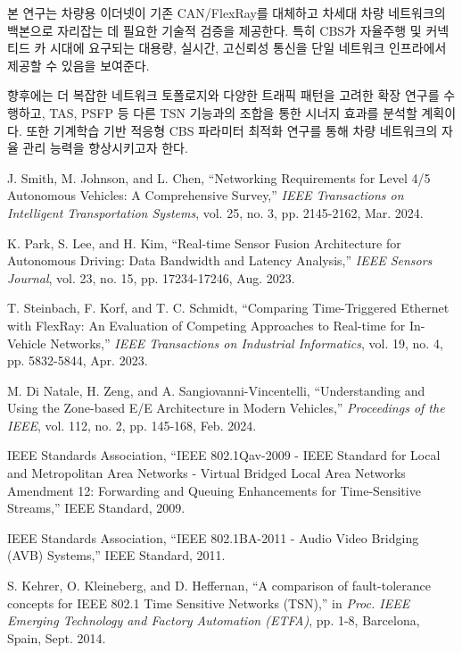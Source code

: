 \documentclass[10pt,twocolumn]{IEEEtran}
\begin{document}
본 연구는 차량용 이더넷이 기존 CAN/FlexRay를 대체하고 차세대 차량 네트워크의 백본으로 자리잡는 데 필요한 기술적 검증을 제공한다. 특히 CBS가 자율주행 및 커넥티드 카 시대에 요구되는 대용량, 실시간, 고신뢰성 통신을 단일 네트워크 인프라에서 제공할 수 있음을 보여준다.

향후에는 더 복잡한 네트워크 토폴로지와 다양한 트래픽 패턴을 고려한 확장 연구를 수행하고, TAS, PSFP 등 다른 TSN 기능과의 조합을 통한 시너지 효과를 분석할 계획이다. 또한 기계학습 기반 적응형 CBS 파라미터 최적화 연구를 통해 차량 네트워크의 자율 관리 능력을 향상시키고자 한다.

\begin{thebibliography}{99}

J. Smith, M. Johnson, and L. Chen, ``Networking Requirements for Level 4/5 Autonomous Vehicles: A Comprehensive Survey,'' \textit{IEEE Transactions on Intelligent Transportation Systems}, vol. 25, no. 3, pp. 2145-2162, Mar. 2024.

K. Park, S. Lee, and H. Kim, ``Real-time Sensor Fusion Architecture for Autonomous Driving: Data Bandwidth and Latency Analysis,'' \textit{IEEE Sensors Journal}, vol. 23, no. 15, pp. 17234-17246, Aug. 2023.

T. Steinbach, F. Korf, and T. C. Schmidt, ``Comparing Time-Triggered Ethernet with FlexRay: An Evaluation of Competing Approaches to Real-time for In-Vehicle Networks,'' \textit{IEEE Transactions on Industrial Informatics}, vol. 19, no. 4, pp. 5832-5844, Apr. 2023.

M. Di Natale, H. Zeng, and A. Sangiovanni-Vincentelli, ``Understanding and Using the Zone-based E/E Architecture in Modern Vehicles,'' \textit{Proceedings of the IEEE}, vol. 112, no. 2, pp. 145-168, Feb. 2024.

IEEE Standards Association, ``IEEE 802.1Qav-2009 - IEEE Standard for Local and Metropolitan Area Networks - Virtual Bridged Local Area Networks Amendment 12: Forwarding and Queuing Enhancements for Time-Sensitive Streams,'' IEEE Standard, 2009.

IEEE Standards Association, ``IEEE 802.1BA-2011 - Audio Video Bridging (AVB) Systems,'' IEEE Standard, 2011.

S. Kehrer, O. Kleineberg, and D. Heffernan, ``A comparison of fault-tolerance concepts for IEEE 802.1 Time Sensitive Networks (TSN),'' in \textit{Proc. IEEE Emerging Technology and Factory Automation (ETFA)}, pp. 1-8, Barcelona, Spain, Sept. 2014.


\end{thebibliography}
\end{document}
